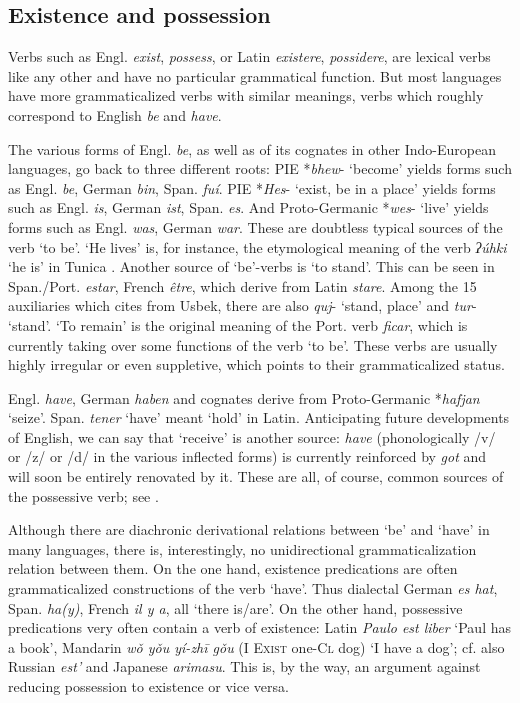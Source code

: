 \subsection{Existence and possession}

Verbs such as Engl. \textit{exist}, \textit{possess}, or Latin \textit{existere}, \textit{possidere}, are lexical verbs like any other and have no particular grammatical function. But most languages have more grammaticalized verbs with similar meanings, verbs which roughly correspond to English \textit{be} and \textit{have}.

The various forms of Engl. \textit{be}, as well as of its cognates in other Indo-European languages, go back to three different roots: PIE *\textit{bhew}{}- ‘become’ yields forms such as Engl. \textit{be}, German \textit{bin}, Span. \textit{fuí}. PIE *\textit{Hes}{}- ‘exist, be in a place’ yields forms such as Engl. \textit{is}, German \textit{ist}, Span. \textit{es}. And Proto-Germanic *\textit{wes}{}- ‘live’ yields forms such as Engl. \textit{was}, German \textit{war}. These are doubtless typical sources of the verb ‘to be’. ‘He lives’ is, for instance, the etymological meaning of the verb \textit{ʔúhki} ‘he is’ in Tunica \citep[41ff]{Haas1941}. Another source of ‘be’-verbs is ‘to stand’. This can be seen in Span./Port. \textit{estar}, French \textit{être}, which derive from Latin \textit{stare}. Among the 15 auxiliaries which \citet[85f]{Žirmunskij1966} cites from Usbek, there are also \textit{quj}{}- ‘stand, place’ and \textit{tur}{}- ‘stand’. ‘To remain’ is the original meaning of the Port. verb \textit{ficar}, which is currently taking over some functions of the verb ‘to be’. These verbs are usually highly irregular or even suppletive, which points to their grammaticalized status.

Engl. \textit{have}, German \textit{haben} and cognates derive from Proto-Germanic *\textit{hafjan} ‘seize’. Span. \textit{tener} ‘have’ meant ‘hold’ in Latin. Anticipating future developments of English, we can say that ‘receive’ is another source: \textit{have} (phonologically /v/ or /z/ or /d/ in the various inflected forms) is currently reinforced by \textit{got} and will soon be entirely renovated by it. These are all, of course, common sources of the possessive verb; see \citet[104-106]{Seiler1983}.

Although there are diachronic derivational relations between ‘be’ and ‘have’ in many languages, there is, interestingly, no unidirectional grammaticalization relation between them. On the one hand, existence predications are often grammaticalized constructions of the verb ‘have’. Thus dialectal German \textit{es hat}, Span. \textit{ha(y)}, French \textit{il y a}, all ‘there is/are’. On the other hand, possessive predications very often contain a verb of existence: Latin \textit{Paulo est liber} ‘Paul has a book’, Mandarin \textit{w\v{o} y\v{o}u yí-zh\=i g\v{o}u} (I \textsc{Exist} one-\textsc{Cl} dog) ‘I have a dog’; cf. also Russian \textit{est'} and Japanese \textit{arimasu}. This is, by the way, an argument against reducing possession to existence or vice versa.

